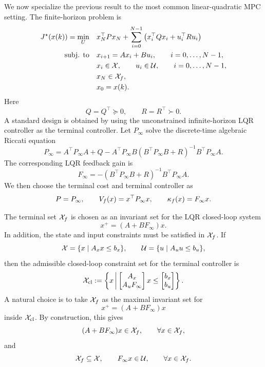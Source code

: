 We now specialize the previous result to the most common linear-quadratic MPC setting. The
finite-horizon problem is
\[
\begin{aligned}
    J^\star(x(k))
    =
    \min_U \quad
    & x_N^\top P x_N
    +
    \sum_{i=0}^{N-1}
    \left(
        x_i^\top Qx_i+u_i^\top Ru_i
    \right)\\
    \text{subj. to}\quad
    & x_{i+1}=Ax_i+Bu_i,
    \qquad i=0,\ldots,N-1,\\
    & x_i\in\mathcal{X},\qquad u_i\in\mathcal{U},
    \qquad i=0,\ldots,N-1,\\
    & x_N\in\mathcal{X}_f,\\
    & x_0=x(k).
\end{aligned}
\]
Here
\[
    Q=Q^\top\succeq 0,
    \qquad
    R=R^\top\succ 0.
\]
A standard design is obtained by using the unconstrained infinite-horizon LQR controller as the
terminal controller. Let \(P_\infty\) solve the discrete-time algebraic Riccati equation
\[
    P_\infty
    =
    A^\top P_\infty A
    +
    Q
    -
    A^\top P_\infty B
    (B^\top P_\infty B+R)^{-1}
    B^\top P_\infty A.
\]
The corresponding LQR feedback gain is
\[
    F_\infty
    =
    -(B^\top P_\infty B+R)^{-1}B^\top P_\infty A.
\]
We then choose the terminal cost and terminal controller as
\[
    P=P_\infty,
    \qquad
    V_f(x)=x^\top P_\infty x,
    \qquad
    \kappa_f(x)=F_\infty x.
\]

The terminal set \(\mathcal{X}_f\) is chosen as an invariant set for the LQR closed-loop system
\[
    x^+=(A+BF_\infty)x.
\]
In addition, the state and input constraints must be satisfied in \(\mathcal{X}_f\). If
\[
    \mathcal{X}=\{x\mid A_xx\leq b_x\},
    \qquad
    \mathcal{U}=\{u\mid A_uu\leq b_u\},
\]
then the admissible closed-loop constraint set for the terminal controller is
\[
    \mathcal{X}_{\mathrm{cl}}
    :=
    \left\{
        x
        \,\middle|\,
        \begin{bmatrix}
            A_x\\
            A_uF_\infty
        \end{bmatrix}x
        \leq
        \begin{bmatrix}
            b_x\\
            b_u
        \end{bmatrix}
    \right\}.
\]
A natural choice is to take \(\mathcal{X}_f\) as the maximal invariant set for
\[
    x^+=(A+BF_\infty)x
\]
inside \(\mathcal{X}_{\mathrm{cl}}\). By construction, this gives
\[
    (A+BF_\infty)x\in\mathcal{X}_f,
    \qquad \forall x\in\mathcal{X}_f,
\]
and
\[
    \mathcal{X}_f\subseteq\mathcal{X},
    \qquad
    F_\infty x\in\mathcal{U},
    \qquad \forall x\in\mathcal{X}_f.
\]

